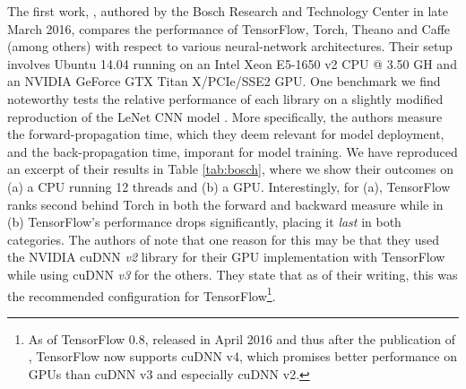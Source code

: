 The first work, \cite{bosch}, authored by the Bosch Research and Technology
Center in late March 2016, compares the performance of TensorFlow, Torch, Theano
and Caffe (among others) with respect to various neural-network architectures.
Their setup involves Ubuntu 14.04 running on an Intel Xeon E5-1650 v2 CPU @ 3.50
GH and an NVIDIA GeForce GTX Titan X/PCIe/SSE2 GPU. One benchmark we find
noteworthy tests the relative performance of each library on a slightly modified
reproduction of the LeNet CNN model \cite{lenet}. More specifically, the authors
measure the forward-propagation time, which they deem relevant for model
deployment, and the back-propagation time, imporant for model training. We have
reproduced an excerpt of their results in Table \ref{tab:bosch}, where we show
their outcomes on (a) a CPU running 12 threads and (b) a GPU. Interestingly, for
(a), TensorFlow ranks second behind Torch in both the forward and backward
measure while in (b) TensorFlow's performance drops significantly, placing it
\emph{last} in both categories. The authors of \cite{bosch} note that one reason
for this may be that they used the NVIDIA cuDNN \emph{v2} library for their GPU
implementation with TensorFlow while using cuDNN \emph{v3} for the others. They
state that as of their writing, this was the recommended configuration for
TensorFlow\footnote{As of TensorFlow 0.8, released in April 2016 and thus after
  the publication of \cite{bosch}, TensorFlow now supports cuDNN v4, which
  promises better performance on GPUs than cuDNN v3 and especially cuDNN v2.}.

